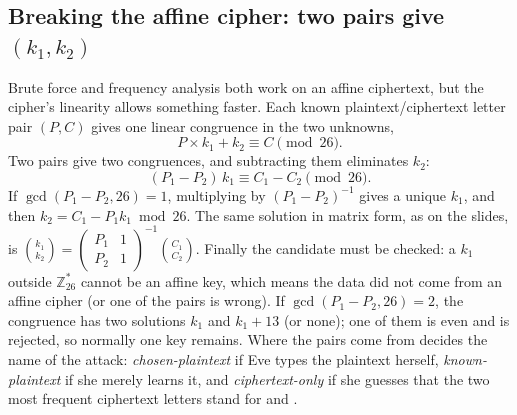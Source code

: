 \subsection{Breaking the affine cipher: two pairs give $(k_1, k_2)$}
Brute force and frequency analysis both work on an affine ciphertext, but the cipher's linearity allows something faster. Each known plaintext/ciphertext letter pair $(P, C)$ gives one linear congruence in the two unknowns,
\[
P \times k_1 + k_2 \equiv C \pmod{26}.
\]
Two pairs give two congruences, and subtracting them eliminates $k_2$:
\[
(P_1 - P_2)\, k_1 \equiv C_1 - C_2 \pmod{26}.
\]
If $\gcd(P_1 - P_2, 26) = 1$, multiplying by $(P_1 - P_2)^{-1}$ gives a unique $k_1$, and then $k_2 = C_1 - P_1 k_1 \bmod 26$. The same solution in matrix form, as on the slides, is $\binom{k_1}{k_2} = \left(\begin{smallmatrix} P_1 & 1\\ P_2 & 1\end{smallmatrix}\right)^{-1} \binom{C_1}{C_2}$. Finally the candidate must be checked: a $k_1$ outside $\mathbb{Z}_{26}^*$ cannot be an affine key, which means the data did not come from an affine cipher (or one of the pairs is wrong). If $\gcd(P_1 - P_2, 26) = 2$, the congruence has two solutions $k_1$ and $k_1 + 13$ (or none); one of them is even and is rejected, so normally one key remains. Where the pairs come from decides the name of the attack: \emph{chosen-plaintext} if Eve types the plaintext herself, \emph{known-plaintext} if she merely learns it, and \emph{ciphertext-only} if she guesses that the two most frequent ciphertext letters stand for  and .

